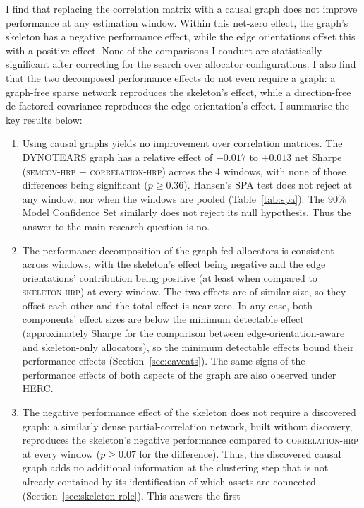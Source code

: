 \documentclass[11pt, a4paper]{report}
\newcommand{\corrhrp}{\textsc{correlation-hrp}}
\newcommand{\skelhrp}{\textsc{skeleton-hrp}}
\newcommand{\semcovhrp}{\textsc{semcov-hrp}}
\begin{document}
I find that replacing the correlation matrix with a causal graph does not improve
performance at any estimation window. Within this net-zero effect, the graph's skeleton has a negative performance effect, while the edge orientations offset this with a positive effect. None of the comparisons I conduct are statistically significant after correcting for the search over allocator configurations. I also find that the two decomposed performance effects do not even require a graph: a graph-free sparse network reproduces the skeleton's effect, while a direction-free de-factored covariance reproduces the edge orientation's effect.
I summarise the key results below:

\begin{enumerate}[itemsep=2pt]
  \item Using causal graphs yields no improvement over correlation matrices. 
        The DYNOTEARS graph has a relative effect of $-0.017$ to $+0.013$ net Sharpe
        (\semcovhrp{} $-$ \corrhrp{}) across the 4 windows, with none of those differences being significant ($p \geq 0.36$).
        Hansen's SPA test does not reject at any window, nor when the windows are pooled (Table~\ref{tab:spa}). The $90\%$ Model Confidence Set similarly does not reject its null hypothesis. Thus the answer to the main research question is no.
  \item The performance decomposition of the graph-fed allocators is consistent across windows, with the skeleton's effect being negative and the edge orientations' contribution being positive (at least when compared to \skelhrp{}) at every window. The two effects are of similar size, so they offset each other and the total effect is near zero. In any case, both components' effect sizes are below the minimum detectable effect (approximately \rsContrastMDEOrient{} Sharpe for the comparison between edge-orientation-aware and skeleton-only allocators), so the minimum detectable effects bound their performance effects (Section~\ref{sec:caveats}). The same signs of the performance effects of both aspects of the graph are also observed under HERC.
  \item The negative performance effect of the skeleton does not require a discovered graph: a similarly dense
        partial-correlation network, built
        without discovery, reproduces the skeleton's negative performance compared to \corrhrp{} at
        every window ($p \geq 0.07$ for the difference). Thus, the discovered causal graph adds no additional information at the clustering 
        step that is not already contained by its identification of which assets are connected (Section~\ref{sec:skeleton-role}). This answers the first

\end{enumerate}
\end{document}
